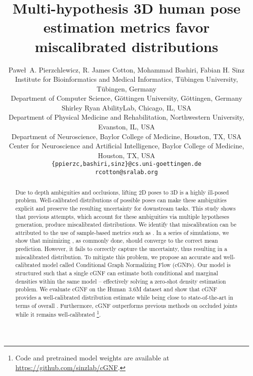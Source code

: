 \documentclass{article} \usepackage{iclr2023_conference,times}
\title{Multi-hypothesis 3D human pose estimation metrics favor miscalibrated distributions}
\author{Pawe\l\ A. Pierzchlewicz, R. James Cotton, Mohammad Bashiri, Fabian H. Sinz\\
Institute for Bioinformatics and Medical Informatics, Tübingen University, Tübingen, Germany\\
Department of Computer Science, Göttingen University, Göttingen, Germany\\
Shirley Ryan AbilityLab, Chicago, IL, USA\\
Department of Physical Medicine and Rehabilitation, Northwestern University, Evanston, IL, USA \\
Department of Neuroscience, Baylor College of Medicine, Houston, TX, USA\\
Center for Neuroscience and Artificial Intelligence, Baylor College of Medicine, Houston, TX, USA\\
\texttt{\{ppierzc,bashiri,sinz\}@cs.uni-goettingen.de}\\\texttt{rcotton@sralab.org}
}
\begin{document}
\maketitle

\begin{abstract}
Due to depth ambiguities and occlusions, lifting 2D poses to 3D is a highly ill-posed problem.
Well-calibrated distributions of possible poses can make these ambiguities explicit and preserve the resulting uncertainty for downstream tasks. 
This study shows that previous attempts, which account for these ambiguities via multiple hypotheses generation, produce miscalibrated distributions.
We identify that miscalibration can be attributed to the use of sample-based metrics such as .
In a series of simulations, we show that minimizing , as commonly done, should converge to the correct mean prediction.
However, it fails to correctly capture the uncertainty, thus resulting in a miscalibrated distribution.
To mitigate this problem, we propose an accurate and well-calibrated model called Conditional Graph Normalizing Flow (cGNFs).
Our model is structured such that a single cGNF can estimate both conditional and marginal densities within the same model -- effectively solving a zero-shot density estimation problem.
We evaluate cGNF on the Human~3.6M dataset and show that cGNF provides a well-calibrated distribution estimate while being close to state-of-the-art in terms of overall .
Furthermore, cGNF outperforms previous methods on occluded joints while it remains well-calibrated \footnote{Code and pretrained model weights are available at \url{https://github.com/sinzlab/cGNF}.}.
\end{abstract}
\end{document}
